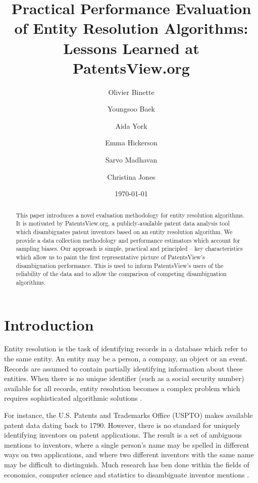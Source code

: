 \documentclass[fontsize=11pt]{article}
\title{Practical Performance Evaluation of Entity Resolution Algorithms: Lessons Learned at PatentsView.org}
\author[1,2]{Olivier Binette}
\author[1]{Youngsoo Baek}
\author[2]{Aida York}
\author[2]{Emma Hickerson}
\author[2]{Sarvo Madhavan}
\author[2]{Christina Jones}
\affil[1]{Department of Statistical Science, Duke University}
\affil[2]{American Institutes for Research}
\date{\today}
\theoremstyle{definition}
\begin{document}
\maketitle

\begin{abstract}
This paper introduces a novel evaluation methodology for entity resolution algorithms. It is motivated by PatentsView.org, a publicly-available patent data analysis tool which disambiguates patent inventors based on an entity resolution algorithm. We provide a data collection methodology and performance estimators which account for sampling biases. Our approach is simple, practical and principled -- key characteristics which allow us to paint the first representative picture of PatentsView's disambiguation performance. This is used to inform PatentsView's users of the reliability of the data and to allow the comparison of competing disambiguation algorithms.
\end{abstract}

\section{Introduction}
Entity resolution is the task of identifying records in a database which refer to the same entity. An entity may be a person, a company, an object or an event. Records are assumed to contain partially identifying information about these entities. When there is no unique identifier (such as a social security number) available for all records, entity resolution becomes a complex problem which requires sophisticated algorithmic solutions \citep{Herzog2007, Christen2012, Dong2015, Ilyas2019, Christophides2019, Christen2019, Papadakis2021, Binette2022a}. 

For instance, the U.S. Patents and Trademarks Office (USPTO) makes available patent data dating back to 1790. However, there is no standard for uniquely identifying inventors on patent applications. The result is a set of ambiguous mentions to inventors, where a single person's name may be spelled in different ways on two applications, and where two different inventors with the same name may be difficult to distinguish. Much research has ben done within the fields of economics, computer science and statistics to disambiguate inventor mentions \citep{trajtenberg2008identification, ferreira2012brief, ventura2013methods, Li2014, Ventura2015, kim2016random, yang2017mixture, morrison2017disambiguation, muller2017semantic, traylor2017learning, balsmeier2018machine,tam2019optimal, monath2019scalable, doherr2021disambiguation}.
\end{document}
